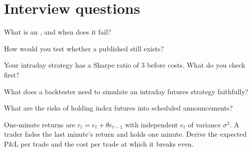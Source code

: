 \section{Interview questions}

\begin{interviewq}\label{iq:s1:short-term-futures-strategies:1}
What is an , and when does it fail?
\end{interviewq}

\begin{interviewq}\label{iq:s1:short-term-futures-strategies:2}
How would you test whether a published  still exists?
\end{interviewq}

\begin{interviewq}\label{iq:s1:short-term-futures-strategies:3}
Your intraday strategy has a Sharpe ratio of 3 before costs. What do you check first?
\end{interviewq}

\begin{interviewq}\label{iq:s1:short-term-futures-strategies:4}
What does a backtester need to simulate an intraday futures strategy faithfully?
\end{interviewq}

\begin{interviewq}\label{iq:s1:short-term-futures-strategies:5}
What are the risks of holding index futures into scheduled announcements?
\end{interviewq}

\begin{interviewq}\label{iq:s1:short-term-futures-strategies:6}
One-minute returns are $r_t = e_t + \theta e_{t-1}$ with independent $e_t$ of variance $\sigma^2$. A trader fades the last minute's return and holds one
minute. Derive the expected P\&L per trade and the cost per trade at which it breaks even.
\end{interviewq}
